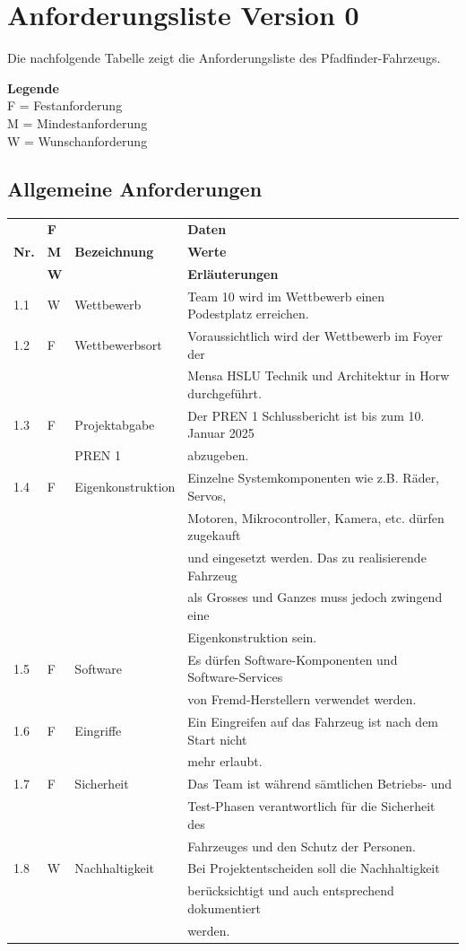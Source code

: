 \documentclass[../main.tex]{subfiles}
\begin{document}
\section{Anforderungsliste Version 0}

Die nachfolgende Tabelle zeigt die Anforderungsliste des Pfadfinder-Fahrzeugs.

\textbf{Legende} \\ F = Festanforderung \\ M = Mindestanforderung \\ W = Wunschanforderung

\subsection{Allgemeine Anforderungen}
\begin{tabular}{|l|l|l|l|}
  \hline
  & \textbf{F} & & \textbf{Daten} \\
  \textbf{Nr.} & \textbf{M} & \textbf{Bezeichnung} & \textbf{Werte} \\
  & \textbf{W} & & \textbf{Erläuterungen} \\
  \hline
  1.1 & W & Wettbewerb & Team 10 wird im Wettbewerb einen Podestplatz
  erreichen. \\
  \hline
  1.2 & F & Wettbewerbsort & Voraussichtlich wird der Wettbewerb im
  Foyer der \\
  & & & Mensa HSLU Technik und Architektur in Horw durchgeführt. \\
  \hline
  1.3 & F & Projektabgabe & Der PREN 1 Schlussbericht ist bis zum 10.
  Januar 2025 \\
  & & PREN 1 & abzugeben. \\
  \hline
  1.4 & F & Eigenkonstruktion & Einzelne Systemkomponenten wie z.B.
  Räder, Servos, \\
  & & & Motoren, Mikrocontroller, Kamera, etc. dürfen zugekauft \\
  & & & und eingesetzt werden. Das zu realisierende Fahrzeug \\
  & & & als Grosses und Ganzes muss jedoch zwingend eine \\
  & & & Eigenkonstruktion sein. \\
  \hline
  1.5 & F & Software & Es dürfen Software-Komponenten und Software-Services \\
  & & & von Fremd-Herstellern verwendet werden. \\
  \hline
  1.6 & F & Eingriffe & Ein Eingreifen auf das Fahrzeug ist nach dem
  Start nicht \\
  & & & mehr erlaubt. \\
  \hline
  1.7 & F & Sicherheit & Das Team ist während sämtlichen Betriebs- und \\
  & & & Test-Phasen verantwortlich für die Sicherheit des \\
  & & & Fahrzeuges und den Schutz der Personen. \\
  \hline
  1.8 & W & Nachhaltigkeit & Bei Projektentscheiden soll die Nachhaltigkeit \\
  & & & berücksichtigt und auch entsprechend dokumentiert \\
  & & & werden. \\
  \hline
\end{tabular}
\end{document}
